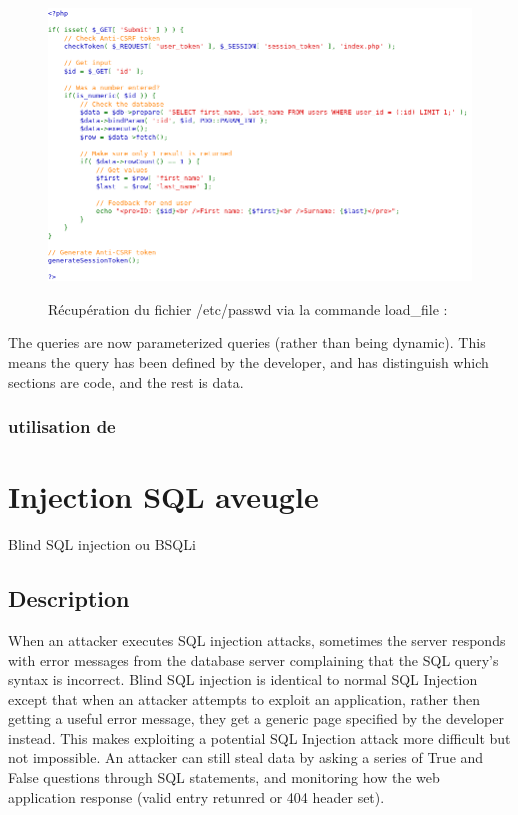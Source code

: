 \begin{figure}[!h]
	\begin{center}
		\label{}
		\includegraphics[scale=\scaledvwa]{images/sql/sqli_impossible.png}
		\caption{Récupération du fichier /etc/passwd via la commande load\_file : }
	\end{center}
\end{figure}

The queries are now parameterized queries (rather than being dynamic). This means the query has been defined by the developer, and has distinguish which sections are code, and the rest is data.


\subsubsection{utilisation de }























\section{Injection SQL aveugle}
Blind SQL injection ou BSQLi
\subsection{Description}
When an attacker executes SQL injection attacks, sometimes the server responds with error messages from the database server complaining that the SQL query's syntax is incorrect. Blind SQL injection is identical to normal SQL Injection except that when an attacker attempts to exploit an application, rather then getting a useful error message, they get a generic page specified by the developer instead. This makes exploiting a potential SQL Injection attack more difficult but not impossible. An attacker can still steal data by asking a series of True and False questions through SQL statements, and monitoring how the web application response (valid entry retunred or 404 header set).

